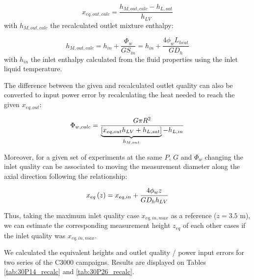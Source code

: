 \begin{equation}
x_{eq,out,calc} = \frac{h_{M,out,calc} - h_{L,sat}}{h_{LV}}
\label{eq:xeq_out}
\end{equation}
with $h_{M,out,calc}$ the recalculated outlet mixture enthalpy:

\begin{equation}
h_{M,out,calc} = h_{in} + \frac{\Phi_{w}}{G S_{in}} = h_{in} + \frac{4\phi_{w}L_{heat}}{G D_{h}}
\end{equation}
with $h_{in}$ the inlet enthalpy calculated from the fluid properties using the inlet liquid temperature.

\npar
The difference between the given and recalculated outlet quality can also be converted to input power error by recalculating the heat needed to reach the given $x_{eq,out}$:

\begin{equation}
\Phi_{w,calc} = \frac{G  \pi R^{2}}{\underbrace{\left[ x_{eq,out}h_{LV}+h_{L,sat} \right]}_{h_{M,out}} - h_{L,in}}
\end{equation}

\npar 


Moreover, for a given set of experiments at the same $P$, $G$ and $\Phi_{w}$ changing the inlet quality can be associated to moving the measurement diameter along the axial direction following the relationship: 

\begin{equation}
x_{eq}\left( z \right) = x_{eq,in} + \frac{4 \phi_{w} z }{G D_{h} h_{LV}}
\end{equation}

Thus, taking the maximum inlet quality case $x_{eq,in, max}$ as a reference ($z=3.5$ m), we can estimate the corresponding measurement height $z_{eq}$ of each other cases if the inlet quality was $x_{eq,in, max}$.

\npar

We calculated the equivalent heights and outlet quality / power input errors for two series of the C3000 campaigns. Results are displayed on Tables \ref{tab:30P14_recalc} and \ref{tab:30P26_recalc}.



